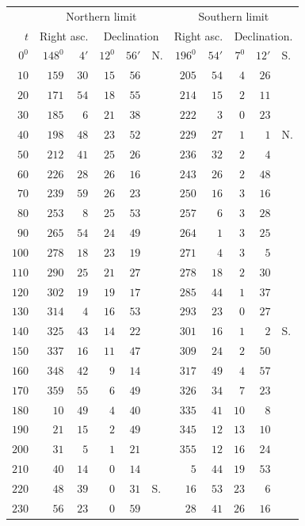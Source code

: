 \begin{center}
\begingroup\small\setlength{\tabcolsep}{5pt}
\begin{tabular}{r||rr|rrl||rr|rrl}
&\multicolumn{5}{c||}{Northern limit}&\multicolumn{5}{c}{Southern limit}\\
$t$&\multicolumn{2}{c|}{Right asc.}&\multicolumn{3}{c||}{Declination}&\multicolumn{2}{c|}{Right asc.}&\multicolumn{3}{c}{Declination.}\\\hline
$0^0$&$148^0$&$4'$&$12^0$&$56'$&N.&$196^0$&$54'$&$7^0$&$12'$&S.\\
$10$&$159$&$30$&$15$&$56$&&$205$&$54$&$4$&$26$&\\
$20$&$171$&$54$&$18$&$55$&&$214$&$15$&$2$&$11$&\\
$30$&$185$&$6$&$21$&$38$&&$222$&$3$&$0$&$23$&\\
$40$&$198$&$48$&$23$&$52$&&$229$&$27$&$1$&$1$&N.\\
$50$&$212$&$41$&$25$&$26$&&$236$&$32$&$2$&$4$&\\
$60$&$226$&$28$&$26$&$16$&&$243$&$26$&$2$&$48$&\\[3pt]
$70$&$239$&$59$&$26$&$23$&&$250$&$16$&$3$&$16$&\\
$80$&$253$&$8$&$25$&$53$&&$257$&$6$&$3$&$28$&\\
$90$&$265$&$54$&$24$&$49$&&$264$&$1$&$3$&$25$&\\
$100$&$278$&$18$&$23$&$19$&&$271$&$4$&$3$&$5$&\\
$110$&$290$&$25$&$21$&$27$&&$278$&$18$&$2$&$30$&\\
$120$&$302$&$19$&$19$&$17$&&$285$&$44$&$1$&$37$&\\[3pt]
$130$&$314$&$4$&$16$&$53$&&$293$&$23$&$0$&$27$&\\
$140$&$325$&$43$&$14$&$22$&&$301$&$16$&$1$&$2$&S.\\
$150$&$337$&$16$&$11$&$47$&&$309$&$24$&$2$&$50$&\\
$160$&$348$&$42$&$9$&$14$&&$317$&$49$&$4$&$57$&\\
$170$&$359$&$55$&$6$&$49$&&$326$&$34$&$7$&$23$&\\
$180$&$10$&$49$&$4$&$40$&&$335$&$41$&$10$&$8$&\\[3pt]
$190$&$21$&$15$&$2$&$49$&&$345$&$12$&$13$&$10$&\\
$200$&$31$&$5$&$1$&$21$&&$355$&$12$&$16$&$24$&\\
$210$&$40$&$14$&$0$&$14$&&$5$&$44$&$19$&$53$&\\
$220$&$48$&$39$&$0$&$31$&S.&$16$&$53$&$23$&$6$&\\
$230$&$56$&$23$&$0$&$59$&&$28$&$41$&$26$&$16$&\\

\end{tabular}
\end{center}
